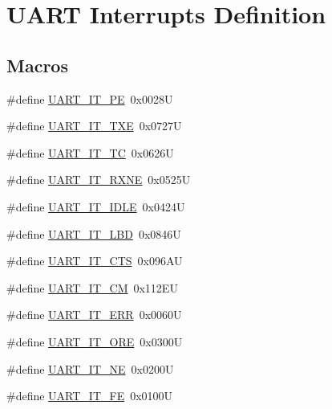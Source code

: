 \hypertarget{group___u_a_r_t___interrupt__definition}{}\section{U\+A\+RT Interrupts Definition}
\label{group___u_a_r_t___interrupt__definition}
\subsection*{Macros}
\begin{DoxyCompactItemize}
\item 
\#define \mbox{\hyperlink{group___u_a_r_t___interrupt__definition_ga55f922ddcf513509710ade5d7c40a1db}{U\+A\+R\+T\+\_\+\+I\+T\+\_\+\+PE}}~0x0028U
\item 
\#define \mbox{\hyperlink{group___u_a_r_t___interrupt__definition_ga552636e2af516d578856f5ee2ba71ed7}{U\+A\+R\+T\+\_\+\+I\+T\+\_\+\+T\+XE}}~0x0727U
\item 
\#define \mbox{\hyperlink{group___u_a_r_t___interrupt__definition_gab9a4dc4e8cea354fd60f4117513b2004}{U\+A\+R\+T\+\_\+\+I\+T\+\_\+\+TC}}~0x0626U
\item 
\#define \mbox{\hyperlink{group___u_a_r_t___interrupt__definition_gac1bedf7a65eb8c3f3c4b52bdb24b139d}{U\+A\+R\+T\+\_\+\+I\+T\+\_\+\+R\+X\+NE}}~0x0525U
\item 
\#define \mbox{\hyperlink{group___u_a_r_t___interrupt__definition_ga9781808d4f9999061fc2da36572191d9}{U\+A\+R\+T\+\_\+\+I\+T\+\_\+\+I\+D\+LE}}~0x0424U
\item 
\#define \mbox{\hyperlink{group___u_a_r_t___interrupt__definition_gabca5e77508dc2dd9aa26fcb683d9b988}{U\+A\+R\+T\+\_\+\+I\+T\+\_\+\+L\+BD}}~0x0846U
\item 
\#define \mbox{\hyperlink{group___u_a_r_t___interrupt__definition_ga986d271478550f9afa918262ca642333}{U\+A\+R\+T\+\_\+\+I\+T\+\_\+\+C\+TS}}~0x096\+AU
\item 
\#define \mbox{\hyperlink{group___u_a_r_t___interrupt__definition_ga4c22e866bce68975a180828012489106}{U\+A\+R\+T\+\_\+\+I\+T\+\_\+\+CM}}~0x112\+EU
\item 
\#define \mbox{\hyperlink{group___u_a_r_t___interrupt__definition_ga8eb26d8edd9bf78ae8d3ad87dd51b618}{U\+A\+R\+T\+\_\+\+I\+T\+\_\+\+E\+RR}}~0x0060U
\item 
\#define \mbox{\hyperlink{group___u_a_r_t___interrupt__definition_ga333810cb588a739ad49042b9f564a6b2}{U\+A\+R\+T\+\_\+\+I\+T\+\_\+\+O\+RE}}~0x0300U
\item 
\#define \mbox{\hyperlink{group___u_a_r_t___interrupt__definition_ga35c77abdf7744b407d5ba751e546e965}{U\+A\+R\+T\+\_\+\+I\+T\+\_\+\+NE}}~0x0200U
\item 
\#define \mbox{\hyperlink{group___u_a_r_t___interrupt__definition_ga98cbd9e918bcc56f329a803febaab468}{U\+A\+R\+T\+\_\+\+I\+T\+\_\+\+FE}}~0x0100U
\end{DoxyCompactItemize}


